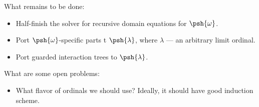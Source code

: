 What remains to be done:
\begin{itemize}
\item Half-finish the solver for recursive domain equations for
$\psh{\omega}$.
\item Port $\psh{\omega}$-specific parts t $\psh{\lambda}$, where
$\lambda$ --- an arbitrary limit ordinal.
\item Port guarded interaction trees to $\psh{\lambda}$.
\end{itemize}

What are some open problems:
\begin{itemize}
\item What flavor of ordinals we should use? Ideally, it should have
good induction scheme.
\end{itemize}


